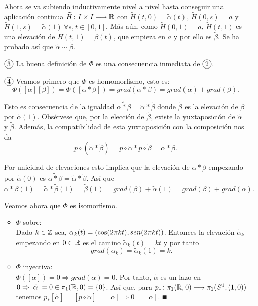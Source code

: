 \documentclass[GTS.tex]{subfiles}
\begin{document}
\begin{dem}
\begin{enumerate}
Ahora se va subiendo inductivamente nivel a nivel hasta conseguir una aplicación continua $\widetilde{H}\colon{I\times I}\longrightarrow{\mathbb{R}}$ con $\widetilde{H}(t,0)=\tilde{\alpha}(t)$, $\widetilde{H}(0,s)=a$ y $\widetilde{H}(1,s)=\tilde{\alpha}(1)\ \forall s,t\in[0,1]$. Más aún, como
$\widetilde{H}(0,1)=a$, $\widetilde{H}(t,1)$ es una elevación de $H(t,1)=\beta(t)$, que empieza en $a$ y por ello es $\tilde{\beta}$. Se ha probado así que $\tilde{\alpha}\sim\tilde{\beta}$.

\item[$\circled{3}$] La buena definición de $\Phi$ es una consecuencia inmediata de $\circled{2}$.

\item[$\circled{4}$] Veamos primero que $\Phi$ es homomorfismo, esto es:
\[
\Phi([\alpha][\beta])=\Phi([\alpha*\beta])=grad(\alpha*\beta)=grad(\alpha)+grad(\beta).
\]

Esto es consecuencia de la igualdad $\widetilde{\alpha*\beta}=\tilde{\alpha}*\tilde{\beta}$ donde $\tilde{\beta}$ es la elevación de $\beta$ por $\tilde{\alpha}(1)$. Obsérvese que, por la elección de $\tilde{\beta}$, existe la yuxtaposición de $\tilde{\alpha}$ y $\tilde{\beta}$. Además, la compatibilidad de esta yuxtaposición con la composición nos da
\[
p\circ(\tilde{\alpha}*\tilde{\beta})=p\circ\tilde{\alpha}*p\circ\tilde{\beta}=\alpha*\beta.
\]

Por unicidad de elevaciones esto implica que la elevación de $\alpha*\beta$ empezando por $\tilde{\alpha}(0)$ es $\widetilde{\alpha*\beta}=\tilde{\alpha}*\tilde{\beta}$. Así que
\[
\widetilde{\alpha*\beta}(1)=\tilde{\alpha}*\tilde{\beta}(1)=\tilde{\beta}(1)=grad(\beta)+\tilde{\alpha}(1)=grad(\beta)+grad(\alpha).
\]


Veamos ahora que $\Phi$ es isomorfismo.
\begin{itemize}
\item $\Phi$ sobre:\\
Dado $k\in\mathbb{Z}$ sea, $\alpha_k(t)=(\cos(2\pi kt),sen (2\pi kt))$. Entonces la elevación $\tilde{\alpha}_k$ empezando en $0\in\mathbb{R}$ es el camino $\tilde{\alpha}_k(t)=k t$ y por tanto
\[
grad(\alpha_k)=\tilde{\alpha}_k(1)=k.
\]

\item $\Phi$ inyectiva:\\
$\Phi([\alpha])=0\Rightarrow grad(\alpha)=0$. Por tanto, $\tilde{\alpha}$ es un lazo en $0\Rightarrow [\tilde{\alpha}]=0\in\pi_1(\mathbb{R},0)=\{0\}$. Así que, para $p_*\colon{\pi_1(\mathbb{R},0)}\longrightarrow{\pi_1(S^1,(1,0))}$ tenemos $p_*[\tilde{\alpha}]=[p\circ\tilde{\alpha}]=[\alpha]\Rightarrow 0=[\alpha]$. $\QED$
\end{itemize}
\end{enumerate}
\end{dem}
\end{document}

